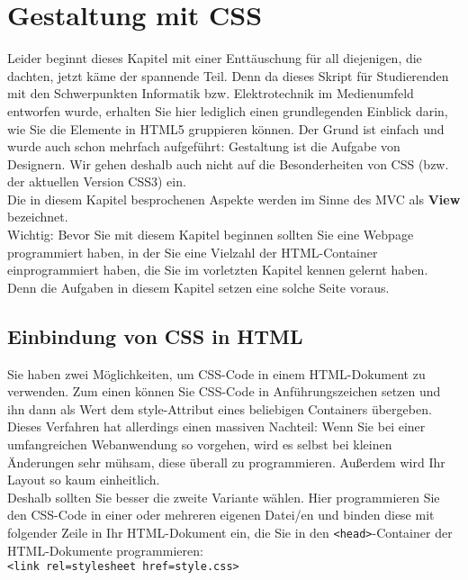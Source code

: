 \chapter{Gestaltung mit CSS}

Leider beginnt dieses Kapitel mit einer Enttäuschung für all diejenigen, die dachten, jetzt käme der spannende Teil. Denn da dieses Skript für Studierenden mit den Schwerpunkten Informatik bzw. Elektrotechnik im Medienumfeld entworfen wurde, erhalten Sie hier lediglich einen grundlegenden Einblick darin, wie Sie die Elemente in HTML5 gruppieren können. Der Grund ist einfach und wurde auch schon mehrfach aufgeführt: Gestaltung ist die Aufgabe von Designern. Wir gehen deshalb auch nicht auf die Besonderheiten von CSS (bzw. der aktuellen Version CSS3) ein.\\

Die in diesem Kapitel besprochenen Aspekte werden im Sinne des MVC als \textbf{View} bezeichnet.\\

Wichtig: Bevor Sie mit diesem Kapitel beginnen sollten Sie eine Webpage programmiert haben, in der Sie eine Vielzahl der HTML-Container einprogrammiert haben, die Sie im vorletzten Kapitel kennen gelernt haben. Denn die Aufgaben in diesem Kapitel setzen eine solche Seite voraus.

\section{Einbindung von CSS in HTML}

Sie haben zwei Möglichkeiten, um CSS-Code in einem HTML-Dokument zu verwenden. Zum einen können Sie CSS-Code in Anführungszeichen setzen und ihn dann als Wert dem style-Attribut eines beliebigen Containers übergeben. Dieses Verfahren hat allerdings einen massiven Nachteil: Wenn Sie bei einer umfangreichen Webanwendung so vorgehen, wird es selbst bei kleinen Änderungen sehr mühsam, diese überall zu programmieren. Außerdem wird Ihr Layout so kaum einheitlich.\\

Deshalb sollten Sie besser die zweite Variante wählen. Hier programmieren Sie den CSS-Code in einer oder mehreren eigenen Datei/en und binden diese mit folgender Zeile in Ihr HTML-Dokument ein, die Sie in den \verb|<head>|-Container der HTML-Dokumente programmieren:\\

\verb|<link rel=stylesheet href=style.css>|\\

